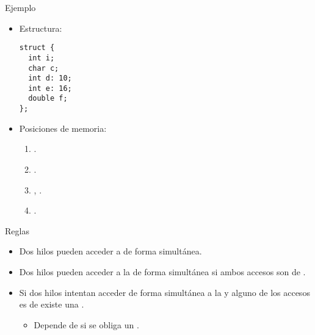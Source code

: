 \begin{frame}[fragile]{Ejemplo}
\begin{itemize}
  \item Estructura:
\begin{lstlisting}
struct {
  int i;
  char c;
  int d: 10;
  int e: 16;
  double f;
};
\end{lstlisting}
  \item Posiciones de memoria:
    \begin{enumerate}
      \item {}.
      \item {}.
      \item {}, .
      \item {}.
    \end{enumerate}
\end{itemize}
\end{frame}

\begin{frame}{Reglas}
\begin{itemize}
  \item Dos hilos pueden acceder a  
        de forma simultánea.

  \item Dos hilos pueden acceder a la  
        de forma simultánea si ambos accesos son de .

  \item Si dos hilos intentan acceder de forma simultánea a la  
        y alguno de los accesos es de  existe una 
        .
    \begin{itemize}
      \item Depende de si se obliga un .
    \end{itemize}
\end{itemize}
\end{frame}

